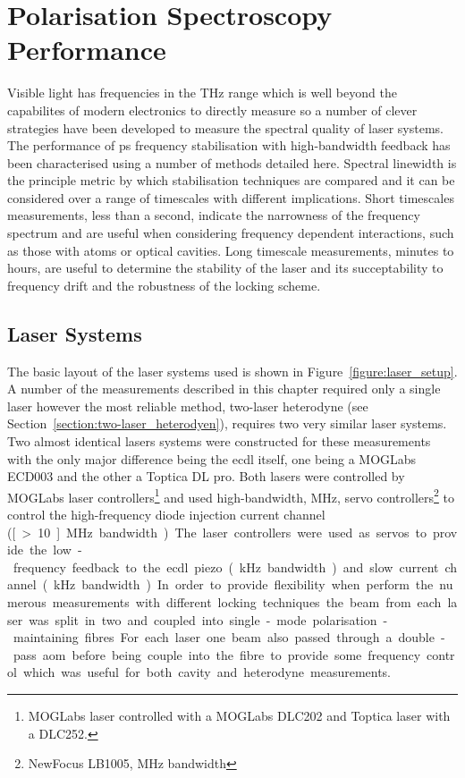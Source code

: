 \section{Polarisation Spectroscopy Performance}
Visible light has frequencies in the THz range which is well beyond the capabilites of modern electronics to directly measure so a number of clever strategies have been developed to measure the spectral quality of laser systems.
The performance of \gls*{ps} frequency stabilisation with high-bandwidth feedback has been characterised using a number of methods detailed here.
Spectral linewidth is the principle metric by which stabilisation techniques are compared and it can be considered over a range of timescales with different implications.
Short timescales measurements, less than a second, indicate the narrowness of the frequency spectrum and are useful when considering frequency dependent interactions, such as those with atoms or optical cavities.
Long timescale measurements, minutes to hours, are useful to determine the stability of the laser and its succeptability to frequency drift and the robustness of the locking scheme.

\subsection{Laser Systems}

The basic layout of the laser systems used is shown in Figure~\ref{figure:laser_setup}.
A number of the measurements described in this chapter required only a single laser however the most reliable method, two-laser heterodyne (see Section~\ref{section:two-laser_heterodyen}), requires two very similar laser systems.
Two almost identical lasers systems were constructed for these measurements with the only major difference being the \gls{ecdl} itself, one being a MOGLabs ECD003 and the other a Toptica DL pro.
Both lasers were controlled by MOGLabs laser controllers\footnote{MOGLabs laser controlled with a MOGLabs DLC202 and Toptica laser with a DLC252.} and used high-bandwidth, \unit[14]{MHz}, servo controllers\footnote{NewFocus LB1005, \unit[14]{MHz} bandwidth} to control the high-frequency diode injection current channel (\unit[>10]{MHz} bandwidth).
The laser controllers were used as servos to provide the low-frequency feedback to the \gls{ecdl} piezo (\unit[1]{kHz} bandwidth) and slow current channel (\unit[50]{kHz} bandwidth).
In order to provide flexibility when perform the numerous measurements with different locking techniques the beam from each laser was split in two and coupled into single-mode polarisation-maintaining fibres.
For each laser one beam also passed through a double-pass \gls{aom} before being couple into the fibre to provide some frequency control which was useful for both cavity and heterodyne measurements.

